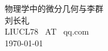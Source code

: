 
\begin{titlepage}
    
\vspace*{10mm}
\begin{center}
    
  {\heiti\Huge{物理学中的微分几何与李群}} \\ [10mm]
  {\large {刘长礼} }\\ [10mm]
  {\large{LIUCL78 {\ AT\ } qq.com }} \\ [10mm]
  
  {\large {\today}} \\ [10mm]
  

\end{center}

\end{titlepage}

\thispagestyle{empty}

\endinput 